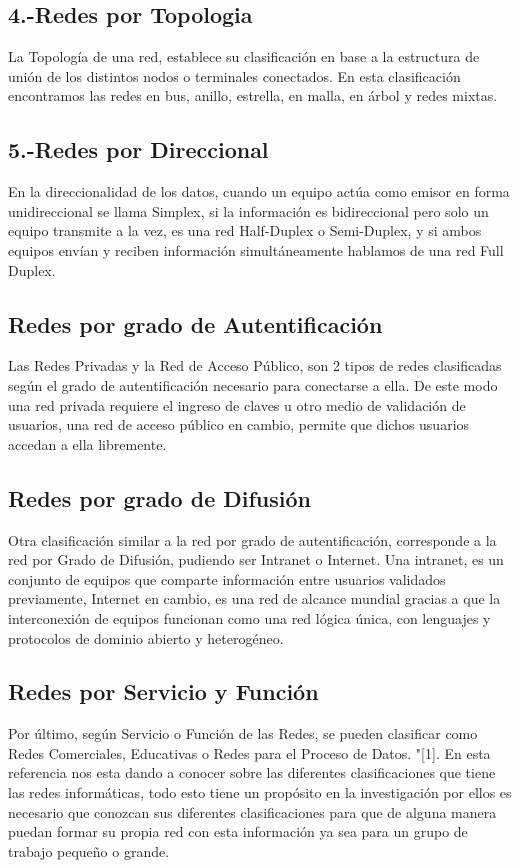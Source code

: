 \documentclass{bmcart}
\begin{document}
\subsection*{4.-Redes por Topologia}
La Topología de una red, establece su clasificación en base a la estructura de unión de los distintos nodos o terminales conectados. En esta clasificación encontramos las redes en bus, anillo, estrella, en malla, en árbol y redes mixtas.
\subsection*{5.-Redes por Direccional}
En la direccionalidad de los datos, cuando un equipo actúa como emisor en forma unidireccional se llama Simplex, si la información es bidireccional  pero solo un equipo transmite a la vez, es una red Half-Duplex  o Semi-Duplex, y si ambos equipos envían y reciben información  simultáneamente hablamos de una red Full Duplex.
\subsection*{Redes por grado de Autentificación}
Las Redes Privadas y la Red de Acceso Público, son 2 tipos de redes clasificadas según el grado de autentificación necesario para conectarse a ella. De este modo una red privada requiere el ingreso de claves u otro medio de validación de usuarios, una red de acceso público en cambio, permite que dichos usuarios accedan a ella libremente.
\subsection*{Redes por grado de Difusión}
Otra clasificación similar a la red por grado de autentificación, corresponde a la red por Grado de Difusión, pudiendo ser Intranet o Internet. Una intranet, es un conjunto de equipos que comparte información entre usuarios validados previamente, Internet  en cambio, es una red de alcance mundial gracias a que la interconexión de equipos funcionan como una red lógica única, con lenguajes y protocolos de dominio abierto y heterogéneo.
\subsection*{Redes por Servicio y Función}
Por último, según Servicio o Función de las Redes, se pueden clasificar como Redes Comerciales, Educativas o Redes para el Proceso de Datos.
"[1]. En esta referencia nos esta dando a conocer sobre las diferentes clasificaciones que tiene las redes informáticas, todo esto tiene un propósito en la investigación por ellos es necesario que conozcan sus diferentes clasificaciones para que de alguna manera puedan formar su propia red con esta información ya sea para un grupo de trabajo pequeño o grande.
\end{document}
